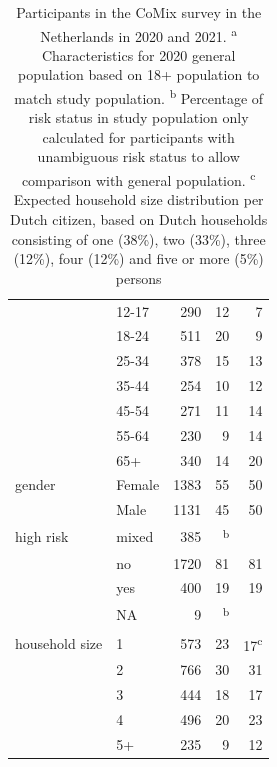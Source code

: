 \documentclass[fleqn,10pt]{wlscirep}
\begin{document}
\begin{table}[ht]
\begin{tabular}{llrrr}
   & 12-17 & 290 & 12 & 7 \\ 
   & 18-24 & 511 & 20 & 9 \\ 
   & 25-34 & 378 & 15 & 13 \\ 
   & 35-44 & 254 & 10 & 12 \\ 
   & 45-54 & 271 & 11 & 14 \\ 
   & 55-64 & 230 & 9 & 14 \\ 
   & 65+ & 340 & 14 & 20 \\ 
  \hline
  gender & Female & 1383 & 55 & 50 \\ 
   & Male & 1131 & 45 & 50 \\ 
  \hline
  high risk & mixed & 385 & \textsuperscript{b} &  \\ 
   & no & 1720 & 81 & 81 \\ 
   & yes & 400 & 19 & 19 \\ 
   & NA & 9 & \textsuperscript{b} &  \\ 
  \hline
  household size & 1 & 573 & 23 & 17\textsuperscript{c} \\ 
   & 2 & 766 & 30 & 31 \\ 
   & 3 & 444 & 18 & 17 \\ 
   & 4 & 496 & 20 & 23 \\ 
   & 5+ & 235 & 9 & 12 \\ 
  \hline
  \hline
\end{tabular}
\caption{\label{tab:part}Participants in the CoMix survey in the Netherlands in 2020 and 2021.
 \protect\linebreak \textsuperscript{a} Characteristics for 2020 general population based on 18+ population to match study population.
 \protect\linebreak \textsuperscript{b} Percentage of risk status in study population only calculated for participants with unambiguous risk status to allow comparison with general population.
\protect\linebreak \textsuperscript{c} Expected household size distribution per Dutch citizen, based on Dutch households consisting of one (38\%), two (33\%), three (12\%), four (12\%) and five or more (5\%) persons \cite{Backer_2021}}
\end{table}



\clearpage
\end{document}
